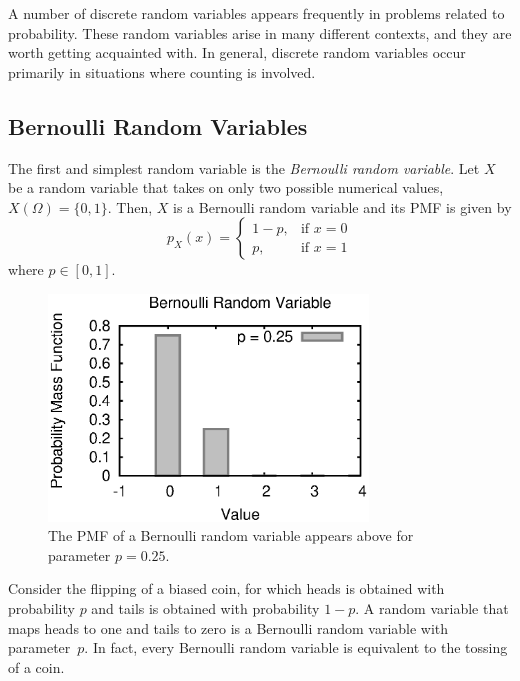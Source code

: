 A number of discrete random variables appears frequently in problems related to probability.
These random variables arise in many different contexts, and they are worth getting acquainted with.
In general, discrete random variables occur primarily in situations where counting is involved.


\subsection{Bernoulli Random Variables}

The first and simplest random variable is the \emph{Bernoulli random variable}. 
Let $X$ be a random variable that takes on only two possible numerical values, $X(\Omega) = \{0, 1\}$.
Then, $X$ is a Bernoulli random variable and its PMF is given by
\begin{equation*}
p_X (x) = \left\{ \begin{array}{ll}
1 - p, & \text{if }x = 0 \\
p, & \text{if }x = 1
\end{array} \right.
\end{equation*}
where $p \in [0, 1]$.

\begin{figure}[ht]
\begin{center}
\includegraphics[width=8.5cm]{Figures/5chapter/bernoulli_pmf}
\end{center}
\caption{The PMF of a Bernoulli random variable appears above for parameter $p = 0.25$.}
\end{figure}

\begin{example}
Consider the flipping of a biased coin, for which heads is obtained with probability $p$ and tails is obtained with probability $1-p$.
A random variable that maps heads to one and tails to zero is a Bernoulli random variable with parameter~$p$.
In fact, every Bernoulli random variable is equivalent to the tossing of a coin.
\end{example}


